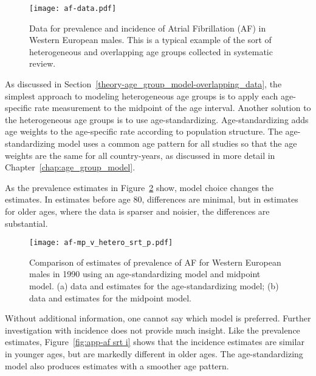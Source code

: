     \begin{figure}[h]
        \begin{center}
            \texttt{[image: af-data.pdf]}
            \caption[Data for prevalence and incidence of Atrial
              Fibrillation (AF) in Western European males]{Data for
              prevalence and incidence of Atrial Fibrillation (AF) in
              Western European males.  This is a typical example of
              the sort of heterogeneous and overlapping age groups
              collected in systematic review.}
            \label{fig:app-af data}
        \end{center}
    \end{figure}

As discussed in Section~\ref{theory-age_group_model-overlapping_data},
the simplest approach to modeling heterogeneous age groups is to apply
each age-specific rate measurement to the midpoint of the age interval.
Another solution to the heterogeneous age groups is to use age-standardizing.
Age-standardizing adds age weights to the age-specific rate according
to population structure.  The age-standardizing model uses a common
age pattern for all studies so that the age weights are the same for
all country-years, as discussed in more detail in Chapter~\ref{chap:age_group_model}.

As the prevalence estimates in Figure~\ref{fig:app-af srt p} show,
model choice changes the estimates.  In estimates before age 80,
differences are minimal, but in estimates for older ages, where the
data is sparser and noisier, the differences are substantial.

    \begin{figure}[h]
        \begin{center}
            \texttt{[image: af-mp\_v\_hetero\_srt\_p.pdf]}
            \caption[Comparison of estimates of prevalence of AF for
              Western European males in 1990 using an
              age-standardizing model and midpoint model]{Comparison
              of estimates of prevalence of AF for Western European
              males in 1990 using an age-standardizing model and
              midpoint model.  (a) data and estimates for the
              age-standardizing model; (b) data and estimates for the
              midpoint model.}
            \label{fig:app-af srt p}
        \end{center}
    \end{figure}

Without additional information, one cannot say which model is preferred.
Further investigation with incidence does not provide much insight.  Like
the prevalence estimates, Figure~\ref{fig:app-af srt i} shows that the
incidence estimates are similar in younger ages, but are markedly different
in older ages.  The age-standardizing model also produces estimates with a
smoother age pattern.

